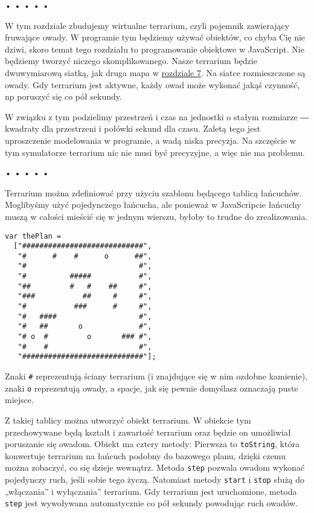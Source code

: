 \begin{center}
• • • • •
\end{center}

  
W tym rozdziale zbudujemy wirtualne terrarium, czyli pojemnik zawierający fruwające owady. W programie tym będziemy używać obiektów, co chyba Cię nie dziwi, skoro temat tego rozdziału to programowanie obiektowe w JavaScript. Nie będziemy tworzyć niczego skomplikowanego. Nasze terrarium będzie dwuwymiarową siatką, jak druga mapa w \hyperref[chap:7]{rozdziale 7}. Na siatce rozmieszczone są owady. Gdy terrarium jest aktywne, każdy owad może wykonać jakąś czynność, np poruszyć się co pół sekundy.

  
W związku z tym podzielimy przestrzeń i czas na jednostki o stałym rozmiarze ― kwadraty dla przestrzeni i połówki sekund dla czasu. Zaletą tego jest uproszczenie modelowania w programie, a wadą niska precyzja. Na szczęście w tym symulatorze terrarium nic nie musi być precyzyjne, a więc nie ma problemu.



\begin{center}
• • • • •
\end{center}

  
Terrarium można zdefiniować przy użyciu szablonu będącego tablicą łańcuchów. Moglibyśmy użyć pojedynczego łańcucha, ale ponieważ w JavaScripcie łańcuchy muszą w całości mieścić się w jednym wierszu, byłoby to trudne do zrealizowania.

  
\begin{verbatim} 
var thePlan =
  ["############################",
   "#      #    #      o      ##",
   "#                          #",
   "#          #####           #",
   "##         #   #    ##     #",
   "###           ##     #     #",
   "#           ###      #     #",
   "#   ####                   #",
   "#   ##       o             #",
   "# o  #         o       ### #",
   "#    #                     #",
   "############################"];
 \end{verbatim}
  
Znaki \texttt{\#} reprezentują ściany terrarium (i znajdujące się w nim ozdobne kamienie), znaki \texttt{o} reprezentują owady, a spacje, jak się pewnie domyślasz oznaczają puste miejsce.

  
Z takiej tablicy można utworzyć obiekt terrarium. W obiekcie tym przechowywane będą kształt i zawartość terrarium oraz będzie on umożliwiał poruszanie się owadom. Obiekt ma cztery metody: Pierwsza to \texttt{toString}, która konwertuje terrarium na łańcuch podobny do bazowego planu, dzięki czemu można zobaczyć, co się dzieje wewnątrz. Metoda \texttt{step} pozwala owadom wykonać pojedynczy ruch, jeśli sobie tego życzą. Natomiast metody \texttt{start} i \texttt{stop} służą do „włączania” i wyłączania” terrarium. Gdy terrarium jest uruchomione, metoda \texttt{step} jest wywoływana automatycznie co pół sekundy powodując ruch owadów.



